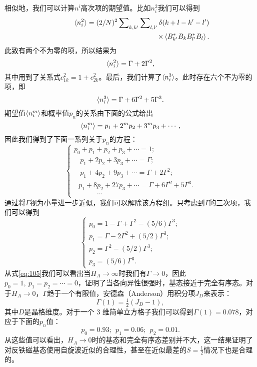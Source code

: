 \documentclass{article}
\begin{document}
相似地，我们可以计算$n^i$高次项的期望值。比如$n_i^2$我们可以得到
\begin{eqnarray} \label{eq:106}
&&\braket{n_i^2}=(2/N)^2\sum\nolimits_{k,k'}\sum\nolimits_{l,l'}\delta(k+l-k'-l')\nonumber\\
&&~~~~~~~~~~~~~~~~~~~~~~~~~~~~~~~~~~~~~~~~~~~\times\braket{B_{k'}^*B_kB_{l'}^*B_l}.
\end{eqnarray}
此致有两个不为零的项，所以结果为
\begin{equation} \label{eq:107}
\braket{n_i^2}=\Gamma+2\Gamma^2,
\end{equation}
其中用到了关系式$c_{1k}^2=1+c_{2k}^2$。最后，我们计算了$\braket{n_i^3}$。此时存在六个不为零的项，即
\begin{equation} \label{eq:108}
\braket{n_i^3}=\Gamma+6\Gamma^2+5\Gamma^3.
\end{equation}
期望值$\braket{n_i^m}$和概率值$p_n$的关系由下面的公式给出
\begin{equation} \label{eq:109}
\braket{n_i^m}=p_1+2^mp_2+3^mp_3+\cdots,
\end{equation}
因此我们得到了下面一系列关于$p_n$的方程：
\begin{equation} \label{eq:110}
\left\{
\begin{array}{l}
p_0+p_1+p_2+p_3+\cdots=1;\\
~~~~p_1+2p_2+3p_3+\cdots=\Gamma;\\
~~~~p_1+4p_2+9p_3+\cdots=\Gamma+2\Gamma^2;\\
~~~p_1+8p_2+27p_3+\cdots=\Gamma+6\Gamma^2+5\Gamma^3.\\
~~~~~~~~~~~~~~~\cdots
\end{array}
\right.
\end{equation}
通过将$\Gamma$视为小量进一步近似，我们可以解除该方程组。只考虑到$\Gamma$的三次项，我们可以得到
\begin{equation} \label{eq:111}
\left\{
\begin{array}{l}
p_0=1-\Gamma+\Gamma^2-(5/6)\Gamma^3;\\
p_1=\Gamma-2\Gamma^2+(5/2)\Gamma^3;\\
p_2=\Gamma^2-(5/2)\Gamma^3;\\
p_3=(5/6)\Gamma^3.
\end{array}
\right.
\end{equation}
从式\eqref{eq:105}我们可以看出当$H_A\rightarrow\infty$时我们有$\Gamma\rightarrow 0$，因此$p_0=1,~p_1=p_2=\cdots=0$，证明了当各向异性很强时，基态接近于完全有序态。对于$H_A\rightarrow 0$，$\Gamma$趋于一个有限值，安德森（Anderson）用积分项$J_D$来表示：
\begin{equation*}
\Gamma(1)=\tfrac{1}{2}(J_D-1),
\end{equation*}
其中$D$是晶格维度。对于一个 3 维简单立方格子我们可以得到$\Gamma(1)=0.078$，对应于下面的$p_n$值：
\begin{equation} \label{eq:112}
p_0=0.93;~~p_1=0.06;~~p_2=0.01.
\end{equation}
从这些值可以看出，$H_A\rightarrow 0$时的基态和完全有序态差别并不大，这一结果证明了对反铁磁基态使用自旋波近似的合理性，甚至在近似最差的$S=\tfrac{1}{2}$情况下也是合理的。
\end{document}
